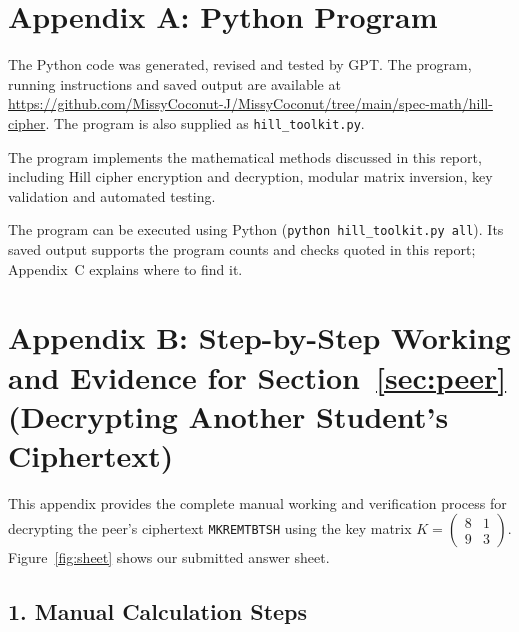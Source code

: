 \documentclass[11pt,a4paper]{article}
\newcommand{\smat}[1]{\left(\begin{smallmatrix}#1\end{smallmatrix}\right)}
\theoremstyle{plain}
\theoremstyle{definition}
\begin{document}
\clearpage
\appendix

\section*{Appendix A: Python Program}

The Python code was generated, revised and tested by GPT. The program, running instructions and saved output are available at \url{https://github.com/MissyCoconut-J/MissyCoconut/tree/main/spec-math/hill-cipher}. The program is also supplied as \texttt{hill\_toolkit.py}.

The program implements the mathematical methods discussed in this report, including Hill cipher encryption and decryption, modular matrix inversion, key validation and automated testing.

The program can be executed using Python (\texttt{python hill\_toolkit.py all}). Its saved output supports the program counts and checks quoted in this report; Appendix~C explains where to find it.

\section*{Appendix B: Step-by-Step Working and Evidence for Section~\ref{sec:peer} (Decrypting Another Student's Ciphertext)}

This appendix provides the complete manual working and verification process for decrypting the peer's ciphertext \texttt{MKREMTBTSH} using the key matrix $K = \smat{8&1\\9&3}$. Figure~\ref{fig:sheet} shows our submitted answer sheet.

\subsection*{1. Manual Calculation Steps}
\end{document}
